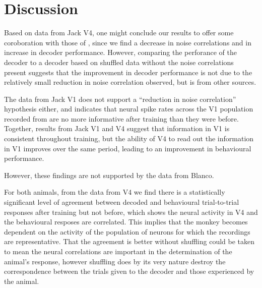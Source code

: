 \clearpage
\section{Discussion}

Based on data from Jack V4, one might conclude our results to offer some coroboration with those of \citet{Gu2011}, since we find a decrease in noise correlations and in increase in decoder performance. However, comparing the perforance of the decoder to a decoder based on shuffled data without the noise correlations present suggests that the improvement in decoder performance is not due to the relatively small reduction in noise correlation observed, but is from other sources.

The data from Jack V1 does not support a ``reduction in noise correlation'' hypothesis either, and indicates that neural spike rates across the V1 population recorded from are no more informative after training than they were before. Together, results from Jack V1 and V4 suggest that information in V1 is consistent throughout training, but the ability of V4 to read out the information in V1 improves over the same period, leading to an improvement in behavioural performance.

However, these findings are not supported by the data from Blanco.


For both animals, from the data from V4 we find there is a statistically significant level of agreement between decoded and behavioural trial-to-trial responses after training but not before, which shows the neural activity in V4 and the behavioural resposes are correlated. This implies that the monkey becomes dependent on the activity of the population of neurons for which the recordings are representative. That the agreement is better without shuffling could be taken to mean the neural correlations are important in the determination of the animal's response, however shuffling does by its very nature destroy the correspondence between the trials given to the decoder and those experienced by the animal.
